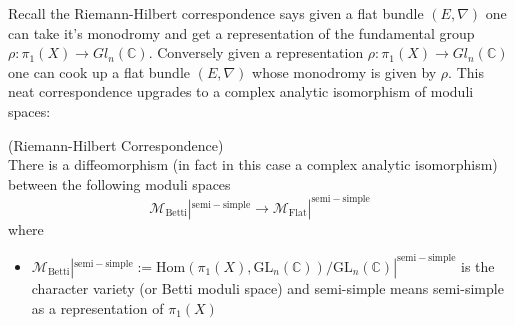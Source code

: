Recall the Riemann-Hilbert correspondence says given a flat bundle $(E,\nabla)$ one can take it's monodromy and get a representation of the fundamental group $\rho:\pi_{1}(X)\rightarrow Gl_{n}(\mathbb{C})$. Conversely given a representation $\rho:\pi_{1}(X)\rightarrow Gl_{n}(\mathbb{C})$ one can cook up a flat bundle $(E,\nabla)$ whose monodromy is given by $\rho$. This neat correspondence upgrades to a complex analytic isomorphism of moduli spaces:

\begin{theorem}(Riemann-Hilbert Correspondence)\\
There is a diffeomorphism (in fact in this case a complex analytic isomorphism) between the following moduli spaces
    \begin{equation}\label{RHC}
        \mathcal{M}_{\mathrm{Betti}}|^{\mathrm{semi-simple}}\rightarrow\mathcal{M}_{\mathrm{Flat}}|^{\mathrm{semi-simple}} 
    \end{equation}
where
\begin{itemize}
\item $\mathcal{M}_{\mathrm{Betti}}|^{\mathrm{semi-simple}}:=\mathrm{Hom}(\pi_1 ( X) , \mathrm{GL}_n(\mathbb{C})) / \mathrm{GL}_n(\mathbb{C})|^{\mathrm{semi-simple}}$ is the character variety (or Betti moduli space) and semi-simple means semi-simple as a representation of $\pi_{1}(X)$
\end{itemize}
\end{theorem}

